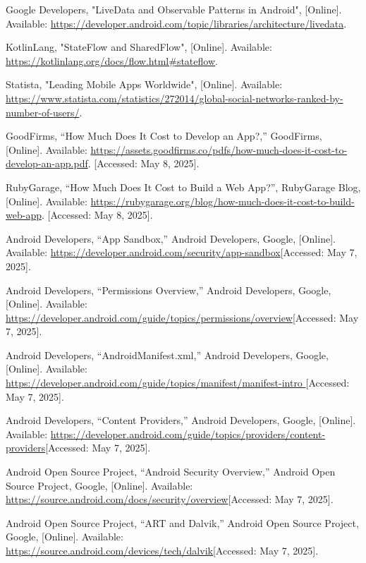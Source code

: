 \documentclass[12pt]{report}
\begin{document}
\begin{thebibliography}{1}
  Google Developers, "LiveData and Observable Patterns in Android", [Online]. Available: \url{https://developer.android.com/topic/libraries/architecture/livedata}.
  
  KotlinLang, "StateFlow and SharedFlow", [Online]. Available: \url{https://kotlinlang.org/docs/flow.html#stateflow}.
  
  Statista, "Leading Mobile Apps Worldwide", [Online]. Available: \url{https://www.statista.com/statistics/272014/global-social-networks-ranked-by-number-of-users/}.

  GoodFirms, “How Much Does It Cost to Develop an App?,” GoodFirms, [Online]. Available: \url{https://assets.goodfirms.co/pdfs/how-much-does-it-cost-to-develop-an-app.pdf}. [Accessed: May 8, 2025].

  RubyGarage, “How Much Does It Cost to Build a Web App?”, RubyGarage Blog, [Online]. Available: \url{https://rubygarage.org/blog/how-much-does-it-cost-to-build-web-app}. [Accessed: May 8, 2025].
  

  Android Developers, “App Sandbox,” Android Developers, Google, [Online]. Available: \url{https://developer.android.com/security/app-sandbox}[Accessed: May 7, 2025].
  
  Android Developers, “Permissions Overview,” Android Developers, Google, [Online]. Available: \url{https://developer.android.com/guide/topics/permissions/overview}[Accessed: May 7, 2025].
  
  Android Developers, “AndroidManifest.xml,” Android Developers, Google, [Online]. Available: \url{https://developer.android.com/guide/topics/manifest/manifest-intro }[Accessed: May 7, 2025].
   
  Android Developers, “Content Providers,” Android Developers, Google, [Online]. Available: \url{https://developer.android.com/guide/topics/providers/content-providers}[Accessed: May 7, 2025].
  
  Android Open Source Project, “Android Security Overview,” Android Open Source Project, Google, [Online]. Available: \url{https://source.android.com/docs/security/overview}[Accessed: May 7, 2025].
 
  Android Open Source Project, “ART and Dalvik,” Android Open Source Project, Google, [Online]. Available: \url{https://source.android.com/devices/tech/dalvik}[Accessed: May 7, 2025].
 

\end{thebibliography}
\end{document}
